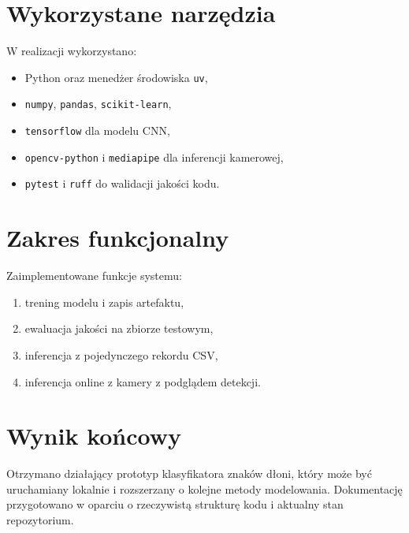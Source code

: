 \section{Wykorzystane narzędzia}
W realizacji wykorzystano:
\begin{itemize}
    \item Python oraz menedżer środowiska \texttt{uv},
    \item \texttt{numpy}, \texttt{pandas}, \texttt{scikit-learn},
    \item \texttt{tensorflow} dla modelu CNN,
    \item \texttt{opencv-python} i \texttt{mediapipe} dla inferencji kamerowej,
    \item \texttt{pytest} i \texttt{ruff} do walidacji jakości kodu.
\end{itemize}

\section{Zakres funkcjonalny}
Zaimplementowane funkcje systemu:
\begin{enumerate}
    \item trening modelu i zapis artefaktu,
    \item ewaluacja jakości na zbiorze testowym,
    \item inferencja z pojedynczego rekordu CSV,
    \item inferencja online z kamery z podglądem detekcji.
\end{enumerate}

\section{Wynik końcowy}
Otrzymano działający prototyp klasyfikatora znaków dłoni, który może być
uruchamiany lokalnie i rozszerzany o kolejne metody modelowania.
Dokumentację przygotowano w oparciu o rzeczywistą strukturę kodu i aktualny
stan repozytorium.
